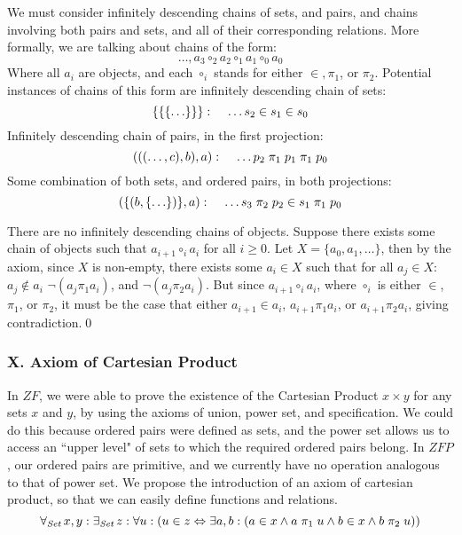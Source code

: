 \documentclass[11pt]{report}
\newcommand{\all}[1]{\forall_{\mathit{#1}}\hspace{0.5mm}}
\newcommand{\ex}[1]{\exists_{\mathit{#1}}\hspace{0.5mm}}
\newcommand{\pleft}{\mathrel{\pi_1}}
\newcommand{\pright}{\mathrel{\pi_2}}
\theoremstyle{definition}
\theoremstyle{theorem}
\theoremstyle{lemma}
\begin{document}
\noindent
We must consider infinitely descending chains of sets, and pairs, and chains involving both pairs and sets, and all of their corresponding relations.
More formally, we are talking about chains of the form:
$$\ldots, a_3 \mathrel{\circ_2} a_2 \mathrel{\circ_1} a_1 \mathrel{\circ_0} a_0$$
Where all $a_i$ are objects, and each $\circ_i$ stands for either $\in, \pleft$, or $\pright$. Potential instances of chains of this form are infinitely descending chain of sets:
  $$\{\{\{\ldots\}\}\}:\hspace{4mm}\ldots s_2 \in s_1 \in s_0$$
Infinitely descending chain of pairs, in the first projection:
  $$(((\ldots, c),b),a):\hspace{4mm}\ldots p_2 \pleft p_1 \pleft p_0$$
Some combination of both sets, and ordered pairs, in both projections:
  $$(\{(b, \{\ldots\})\}, a):\hspace{4mm}\ldots s_3 \pright p_2 \in s_1 \pleft p_0$$

\theorem There are no infinitely descending chains of objects.
\proof Suppose there exists some chain of objects such that $a_{i+1} \mathrel{\circ_i} a_i$ for all $i\geq 0$. Let $X = \{a_0, a_1, \ldots\}$, then by the axiom, since $X$ is non-empty, there exists some $a_i \in X$ such that for all $a_j\in X$: $a_j \notin a_i$ $\neg(a_j\pleft a_i)$, and $\neg (a_j\pright a_i)$.
But since $a_{i+1} \mathrel{\circ_i} a_i$,
where $\mathrel{\circ_i}$ is either $\in$, $\pleft$, or $\pright$, it must be the case that either $a_{i+1} \in a_i$, $a_{i+1}\pleft a_i$, or $a_{i+1}\pright a_i$, giving contradiction.\qed

\subsubsection*{X. Axiom of Cartesian Product}
In $\mathit{ZF}$, we were able to prove the existence of the Cartesian Product $x \times y$ for any sets $x$ and $y$, by using the axioms of union, power set, and specification.
We could do this because ordered pairs were defined as sets, and the power set allows us to access an ``upper level" of sets to which the required ordered pairs belong.
In $\mathit{ZFP}$, our ordered pairs are primitive, and we currently have no operation analogous to that of power set.
We propose the introduction of an axiom of cartesian product, so that we can easily define functions and relations.
$$\all{Set} x,y: \ex{Set} z:
 \forall u: (u \in z \Leftrightarrow
 \exists a,b: (a \in x \wedge a\pleft u \wedge b\in x \wedge b\pright u))$$
\end{document}

